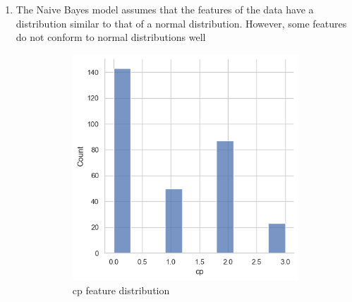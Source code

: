 \documentclass{article}
\begin{document}
\begin{enumerate}[leftmargin=\labelsep]
\begin{enumerate}
\end{enumerate}

\item
The Naive Bayes model assumes that the features of the data have a distribution similar to that of a normal distribution.
However, some features do not conform to normal distributions well


\begin{figure}[H]
    \centering
    \begin{subfigure}{0.3\linewidth}
        \centering
        \includegraphics[width=\linewidth]{img/cp_distrib.png}
        \caption{cp feature distribution}
        \label{fig:cp}
    \end{subfigure}
    \hfill %
    \begin{subfigure}{0.3\linewidth}
        \centering

\end{subfigure}
\end{figure}
\end{enumerate}
\end{document}
